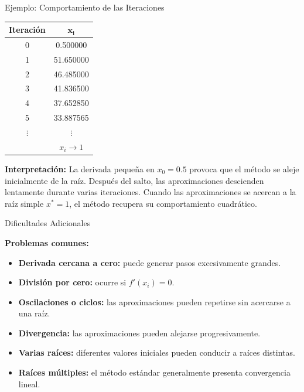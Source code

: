 \documentclass[../../main.tex]{subfiles}
\begin{document}
\begin{frame}{Ejemplo: Comportamiento de las Iteraciones}

\centering

\begin{tabular}{|c|c|}
\hline
\textbf{Iteración} & \(\boldsymbol{x_i}\) \\ \hline
0 & 0.500000 \\ 
1 & 51.650000 \\ 
2 & 46.485000 \\ 
3 & 41.836500 \\ 
4 & 37.652850 \\ 
5 & 33.887565 \\ 
\(\vdots\) & \(\vdots\) \\ 
 & \(x_i\longrightarrow1\) \\ \hline
\end{tabular}

\raggedright
\textbf{Interpretación:}
La derivada pequeña en \(x_0=0.5\) provoca que el método se aleje
inicialmente de la raíz. Después del salto, las aproximaciones
descienden lentamente durante varias iteraciones. Cuando las aproximaciones se acercan a la raíz simple \(x^*=1\), el método recupera su comportamiento cuadrático.

\end{frame}



\begin{frame}{Dificultades Adicionales}

\textbf{Problemas comunes:}

\begin{itemize}
  \item \textbf{Derivada cercana a cero:}
        puede generar pasos excesivamente grandes.

  \item \textbf{División por cero:}
        ocurre si \(f'(x_i)=0\).

  \item \textbf{Oscilaciones o ciclos:}
        las aproximaciones pueden repetirse sin acercarse a una raíz.

  \item \textbf{Divergencia:}
        las aproximaciones pueden alejarse progresivamente.

  \item \textbf{Varias raíces:}
        diferentes valores iniciales pueden conducir a raíces distintas.

  \item \textbf{Raíces múltiples:}
        el método estándar generalmente presenta convergencia lineal.
\end{itemize}

\end{frame}
\end{document}
